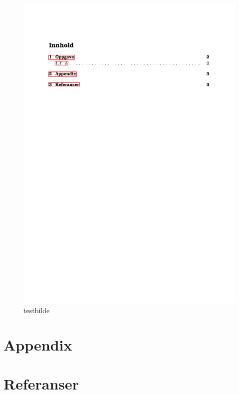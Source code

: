 \documentclass[12pt]{article}
\begin{document}
{\begin{figure}[hbt!]
    {\centering
    \includegraphics{test.pdf}%
    \caption{testbilde}
    \label{test_image}
    \par}
\end{figure}



\newpage
\section{Appendix}
\section{Referanser}
\begingroup
\renewcommand{\section}[2]{}%


\endgroup



 
\end{document}
